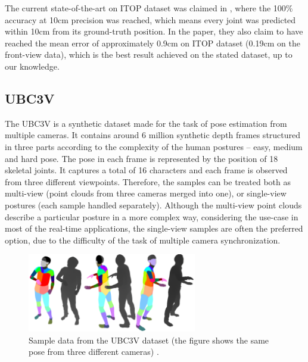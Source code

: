 \noindent
The current state-of-the-art on ITOP dataset was claimed in \cite{Marin18jvcir}, where the 100\% accuracy at 10cm precision was reached, which means every joint was predicted within 10cm from its ground-truth position. In the paper, they also claim to have reached the mean error of approximately 0.9cm on ITOP dataset (0.19cm on the front-view data), which is the best result achieved on the stated dataset, up to our knowledge.

\subsection{UBC3V}

The UBC3V \cite{Shafaei16} is a synthetic dataset made for the task of pose estimation from multiple cameras. It contains around 6 million synthetic depth frames structured in three parts according to the complexity of the human postures – easy, medium and hard pose. The pose in each frame is represented by the position of 18 skeletal joints. It captures a total of 16 characters and each frame is observed from three different viewpoints. Therefore, the samples can be treated both as multi-view (point clouds from three cameras merged into one), or single-view postures (each sample handled separately). Although the multi-view point clouds describe a particular posture in a more complex way, considering the use-case in most of the real-time applications, the single-view samples are often the preferred option, due to the difficulty of the task of multiple camera synchronization.\par

\vspace{5mm}
\begin{figure}[H]
\begin{center}
  \includegraphics[height=130px]{images/implementation/ubc3v.png}
  \caption[Sample data from the UBC3V dataset \cite{Shafaei16}.]{Sample data from the UBC3V dataset (the figure shows the same pose from three different cameras) \cite{Shafaei16}.}
  \label{fig:ubc3v}
\end{center}
\end{figure}

